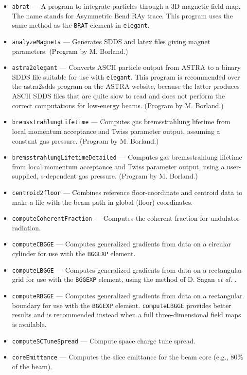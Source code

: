 \documentclass[11pt]{article}
\begin{document}
\begin{itemize}
\item {\tt abrat} --- A program to integrate particles through a 3D magnetic field map. The name 
 stands for Asymmetric Bend RAy trace. This program uses the same method as the \verb|BRAT|
 element in {\tt elegant}.
\item {\tt analyzeMagnets} --- Generates SDDS and latex files giving magnet parameters.
  (Program by M. Borland.)
\item {\tt astra2elegant} --- Converts ASCII particle output from ASTRA \cite{ASTRA} to a binary
  SDDS file suitable for use with {\tt elegant}.  This program is recommended over
  the astra2sdds program on the ASTRA website, because the latter produces ASCII SDDS
  files that are quite slow to read and does not perform the correct computations
  for low-energy beams.
  (Program by M. Borland.)
\item {\tt bremsstrahlungLifetime} --- Computes gas bremsstrahlung lifetime from local momentum acceptance and Twiss parameter output,
  assuming a constant gas pressure.
  (Program by M. Borland.)
\item {\tt bremsstrahlungLifetimeDetailed} --- Computes gas bremsstrahlung lifetime from local momentum acceptance and Twiss 
  parameter output, using a user-supplied, s-dependent gas pressure.
  (Program by M. Borland.)
\item {\tt centroid2floor} --- Combines reference floor-coordinate and centroid data to make a file
  with the beam path in global (floor) coordinates.
\item {\tt computeCoherentFraction} --- Computes the coherent fraction for undulator radiation.
\item {\tt computeCBGGE} --- Computes generalized gradients from data on a circular cylinder
  for use with the \verb|BGGEXP| element. 
\item {\tt computeLBGGE} --- Computes generalized gradients from data on a rectangular grid
  for use with the \verb|BGGEXP| element, using the method of D. Sagan {\em et al.} \cite{sagan:ipac23-wepl015}.
\item {\tt computeRBGGE} --- Computes generalized gradients from data on a rectangular boundary 
  for use with the \verb|BGGEXP| element. \verb|computeLBGGE| provides better results and is recommended instead
  when a full three-dimensional field maps is available.
\item {\tt computeSCTuneSpread} --- Compute space charge tune spread.
\item {\tt coreEmittance} --- Computes the slice emittance for the beam core (e.g., 80\% of the beam).

\end{itemize}
\end{document}
